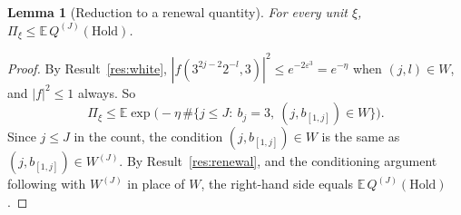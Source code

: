 \documentclass[11pt]{amsart}
\newtheorem{lemma}{Lemma}[section]
\theoremstyle{remark}
\newcommand{\E}{\mathbb{E}}
\newcommand{\Hold}{\mathrm{Hold}}
\newcommand{\T}[1]{\cite[#1]{Tao22}}   %
\theoremstyle{plain}
\begin{document}
\begin{lemma}[Reduction to a renewal quantity]\label{lem:reductionD}
For every unit $\xi$, $\Pi_\xi\le\E\,Q^{(J)}(\Hold)$.
\end{lemma}

\begin{proof}
By Result~\ref{res:white}, $|f(3^{2j-2}2^{-l},3)|^2\le e^{-2\varepsilon^3}=e^{-\eta}$ when $(j,l)\in W$, and $|f|^2\le1$ always. So
\[
\Pi_\xi\le\E\exp\big(-\eta\,\#\{j\le J:\ b_j=3,\ (j,b_{[1,j]})\in W\}\big).
\]
Since $j\le J$ in the count, the condition $(j,b_{[1,j]})\in W$ is the same as $(j,b_{[1,j]})\in W^{(J)}$. By Result~\ref{res:renewal}, and the conditioning argument following \T{(7.35)} with $W^{(J)}$ in place of $W$, the right-hand side equals $\E\,Q^{(J)}(\Hold)$.
\end{proof}
\end{document}
